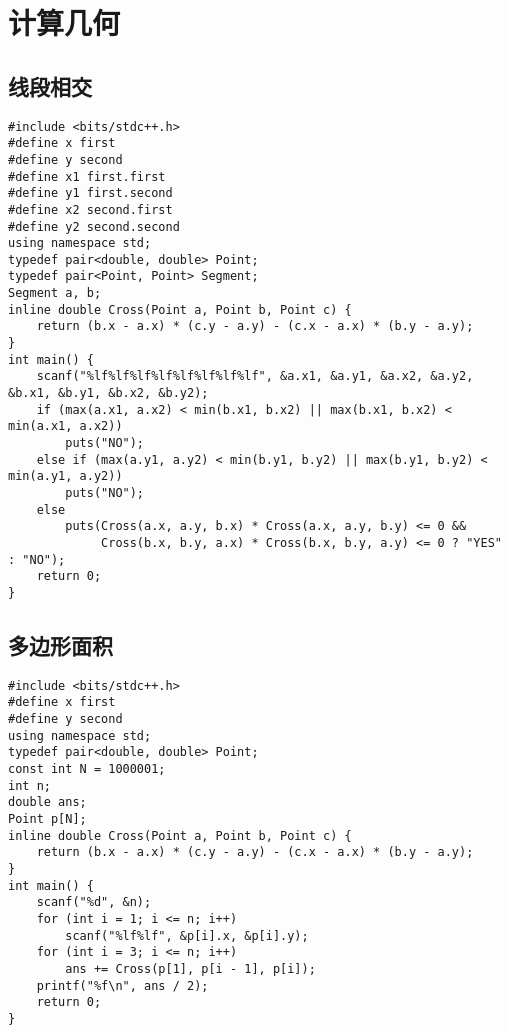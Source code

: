 \documentclass[a4paper]{article}
\begin{document}
\section{计算几何}
\subsection{线段相交}
\begin{lstlisting}
#include <bits/stdc++.h>
#define x first
#define y second
#define x1 first.first
#define y1 first.second
#define x2 second.first
#define y2 second.second
using namespace std;
typedef pair<double, double> Point;
typedef pair<Point, Point> Segment;
Segment a, b;
inline double Cross(Point a, Point b, Point c) {
    return (b.x - a.x) * (c.y - a.y) - (c.x - a.x) * (b.y - a.y);
}
int main() {
    scanf("%lf%lf%lf%lf%lf%lf%lf%lf", &a.x1, &a.y1, &a.x2, &a.y2, &b.x1, &b.y1, &b.x2, &b.y2);
    if (max(a.x1, a.x2) < min(b.x1, b.x2) || max(b.x1, b.x2) < min(a.x1, a.x2))
        puts("NO");
    else if (max(a.y1, a.y2) < min(b.y1, b.y2) || max(b.y1, b.y2) < min(a.y1, a.y2))
        puts("NO");
    else
        puts(Cross(a.x, a.y, b.x) * Cross(a.x, a.y, b.y) <= 0 &&
             Cross(b.x, b.y, a.x) * Cross(b.x, b.y, a.y) <= 0 ? "YES" : "NO");
    return 0;
}
\end{lstlisting}
\subsection{多边形面积}
\begin{lstlisting}
#include <bits/stdc++.h>
#define x first
#define y second
using namespace std;
typedef pair<double, double> Point;
const int N = 1000001;
int n;
double ans;
Point p[N];
inline double Cross(Point a, Point b, Point c) {
    return (b.x - a.x) * (c.y - a.y) - (c.x - a.x) * (b.y - a.y);
}
int main() {
    scanf("%d", &n);
    for (int i = 1; i <= n; i++)
        scanf("%lf%lf", &p[i].x, &p[i].y);
    for (int i = 3; i <= n; i++)
        ans += Cross(p[1], p[i - 1], p[i]);
    printf("%f\n", ans / 2);
    return 0;
}
\end{lstlisting}
\end{document}
